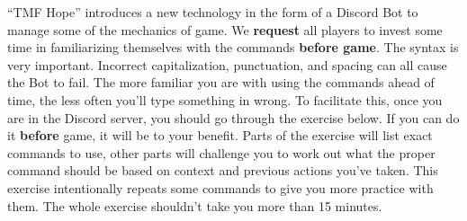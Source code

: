 \documentclass[green]{TMFHope}
\begin{document}
\name{\gDiscord{}}

``TMF Hope'' introduces a new technology in the form of a Discord Bot to manage some of the mechanics of game. We \textbf{request} all players to invest some time in familiarizing themselves with the commands \textbf{before game}. The syntax is very important. Incorrect capitalization, punctuation, and spacing can all cause the Bot to fail. The more familiar you are with using the commands ahead of time, the less often you'll type something in wrong. To facilitate this, once you are in the Discord server, you should go through the exercise below. If you can do it \textbf{before} game, it will be to your benefit. Parts of the exercise will list exact commands to use, other parts will challenge you to work out what the proper command should be based on context and previous actions you've taken. This exercise intentionally repeats some commands to give you more practice with them. The whole exercise shouldn't take you more than 15 minutes.
\end{document}
